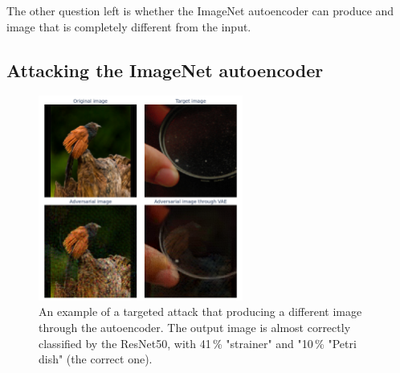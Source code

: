 \documentclass[]{scrarticle}
\begin{document}
The other question left is whether the ImageNet autoencoder can produce
and image that is completely different from the input.

\subsection{Attacking the ImageNet autoencoder}

\begin{figure}[h]
  \centering
  \includegraphics[width=0.6\textwidth]{../images/ae_targeted_attack_example.png}
  \caption{
    An example of a targeted attack that producing a different image
    through the autoencoder.
    The output image is almost correctly classified by the ResNet50,
    with 41\,\% "strainer" and "10\,\% "Petri dish" (the correct one).
  }
  \label{fig:ae_targeted_attack_example}
\end{figure}
\end{document}
